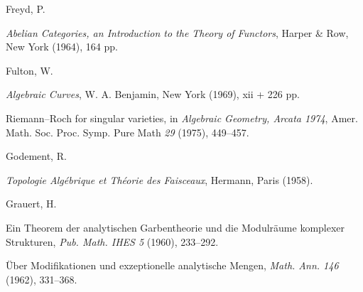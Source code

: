 {\par\vspace{2.15pt}\noindent \hypertarget{bib-475-12}{}Freyd, P.\par
\noindent\hangindent=25bp\hspace*{6bp}%
\emph{Abelian Categories, an Introduction to the Theory of Functors}, Harper \& Row, New York (1964), 164 pp.\par
\par\vspace{2.15pt}\noindent \hypertarget{bib-475-13}{}Fulton, W.\par
\noindent\hangindent=25bp\hspace*{6bp}%
\emph{Algebraic Curves}, W. A. Benjamin, New York (1969), xii + 226 pp.\par
\noindent\hangindent=25bp\hspace*{6bp}%
Riemann--Roch for singular varieties, in \emph{Algebraic Geometry, Arcata 1974}, Amer. Math. Soc. Proc. Symp. Pure Math \emph{29} (1975), 449--457.\par
\par\vspace{2.15pt}\noindent \hypertarget{bib-475-15}{}Godement, R.\par
\noindent\hangindent=25bp\hspace*{6bp}%
\emph{Topologie Alg\'ebrique et Th\'eorie des Faisceaux}, Hermann, Paris (1958).\par
\par\vspace{2.15pt}\noindent \hypertarget{bib-475-16}{}Grauert, H.\par
\noindent\hangindent=25bp\hspace*{6bp}%
Ein Theorem der analytischen Garbentheorie und die Modulr\"aume komplexer Strukturen, \emph{Pub. Math. IHES 5} (1960), 233--292.\par
\noindent\hangindent=25bp\hspace*{6bp}%
\"Uber Modifikationen und exzeptionelle analytische Mengen, \emph{Math. Ann. 146} (1962), 331--368.\par
}
